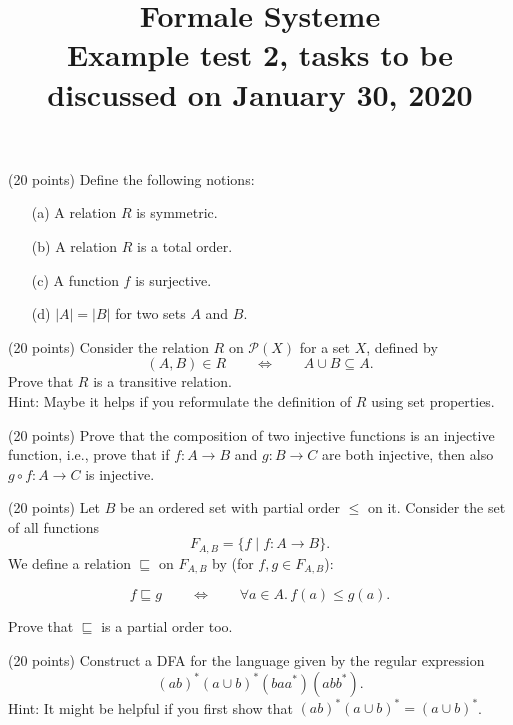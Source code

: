\documentclass{article}
\newcommand{\after}{\mathrel{\circ}}
\begin{document}
\title{Formale Systeme\\
 \small{{\bf{Example test 2, tasks to be discussed on January 30, 2020 }}} }
\date{}

\maketitle
\thispagestyle{empty}



 (20 points) \quad Define the following notions:
\begin{itemize}
	\item[(a)] A relation $R$ is symmetric.
	\item[(b)] A relation $R$ is a total order.
	\item[(c)] A function $f$ is surjective.
	\item[(d)] $|A| = |B|$ for two sets $A$ and $B$.
\end{itemize}

\vspace*{5mm}

 (20 points) \quad
Consider the relation $R$ on $\mathcal{P}(X)$ for a set $X$, defined by
$$(A,B) \in R \qquad \Leftrightarrow \qquad A \cup B \subseteq A .$$
Prove that $R$ is a transitive relation.\\

\noindent Hint: Maybe it helps if you reformulate the definition of $R$ using set properties.

\vspace*{5mm}


 (20 points) \quad
Prove that the composition of two injective functions is an injective function, i.e., prove that if 
$f\colon A \to B$ and $g\colon B  \to C$ are both injective, then also $g \after f \colon A \to C$ is injective.


\vspace*{5mm}

 (20 points) \quad
Let $B$ be an ordered set with partial order $\le$ on it.
Consider the set of all functions $$F_{A,B} = \{ f \mid f \colon A \to B \}.$$
We define a relation $\sqsubseteq$ on $F_{A,B}$ by (for $f, g \in F_{A,B}$):

$$ f \sqsubseteq g \qquad \Leftrightarrow \qquad \forall a \in A.\, f(a) \le g(a).$$  

Prove that $\sqsubseteq$ is a partial order too.

\vspace*{5mm}


 (20 points) \quad
Construct a DFA for the language given by the regular expression 
$$(ab)^*(a \cup b)^*(baa^*)(abb^*).$$
Hint: It might be helpful if you first show that $(ab)^*(a \cup b)^* = (a \cup b)^*$.
\end{document}
